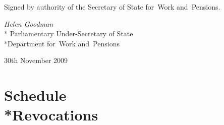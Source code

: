 \documentclass[12pt,a4paper]{article}
\begin{document}
\bigskip

\pagebreak[3]

Signed 
by authority of the 
Secretary of State for~Work and~Pensions.

{\raggedleft
\emph{Helen Goodman}\\*
Parliamentary Under-Secretary 
of State\\*Department 
for~Work and~Pensions

}

30th November 2009

\small

\clearpage

\part[Schedule --- Revocations]{Schedule\\*Revocations}

\renewcommand\parthead{--- Schedule}
\end{document}
